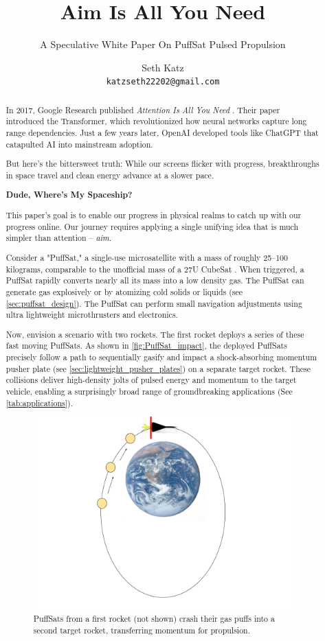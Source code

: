 \documentclass{article}
\title{Aim Is All You Need}
\subtitle{A Speculative White Paper On PuffSat Pulsed Propulsion}
\author{
  Seth Katz \\
  \texttt{katzseth22202@gmail.com} \\
}
\begin{document}
\maketitle

\newpage
\tableofcontents
\newpage

\begin{abstract}\label{sec:abstract}
 
In 2017, Google Research published \textit{Attention Is All You Need} \cite{vaswani2023attentionneed}.  Their paper introduced the Transformer, which revolutionized how neural networks capture long range dependencies.   Just a few years later, OpenAI developed tools like ChatGPT \cite{chatgpt} that catapulted AI into mainstream adoption.

But here's the bittersweet truth:  While our screens flicker with progress, breakthroughs in space travel and clean energy advance at a slower pace.

\textbf{Dude, Where's My Spaceship?}

This paper's goal is to enable our progress in physical realms to catch up with our progress online.  Our journey requires applying a single unifying idea that is much simpler than attention -- \textit{aim}.   

Consider a "PuffSat," a single-use microsatellite with a mass of roughly 25–100 kilograms, comparable to the unofficial mass of a 27U CubeSat \cite{cubesat_27u}.  When triggered, a PuffSat rapidly converts nearly all its mass into a low density gas.  The PuffSat can generate gas explosively or by atomizing cold solids or liquids (see \autoref{sec:puffsat_design}).  The PuffSat can perform small navigation adjustments using ultra lightweight microthrusters and electronics.

Now, envision a scenario with two rockets. The first rocket deploys a series of these fast moving PuffSats. As shown in \autoref{fig:PuffSat_impact}, the deployed PuffSats precisely follow a path to sequentially gasify and impact a shock-absorbing momentum pusher plate (see \autoref{sec:lightweight_pusher_plates}) on a separate target rocket. These collisions deliver high-density jolts of pulsed energy and momentum to the target vehicle, enabling a surprisingly broad range of groundbreaking applications (See \autoref{tab:applications}). 

\begin{figure}[htpb]
    \centering
    \includegraphics[width=0.5\linewidth]{images/Starship_Impact_ellipse.png}
    \caption{PuffSats from a first rocket (not shown) crash their gas puffs into a second target rocket, transferring momentum for propulsion. \cite{earth_image}}
    \label{fig:PuffSat_impact}
\end{figure}


\end{abstract}
\end{document}
